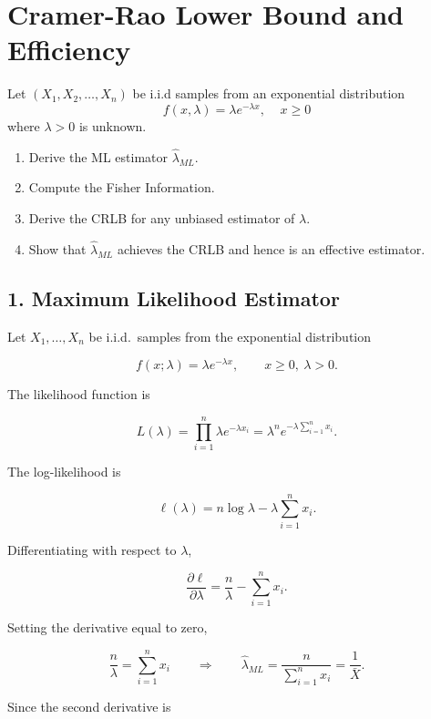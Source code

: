 \clearpage
\section{Cramer-Rao Lower Bound and Efficiency}

\begin{colbox}
	Let $(X_1,X_2,\dots,X_n)$ be i.i.d samples from an exponential distribution
	\begin{equation*}
		f(x,\lambda) = \lambda e^{-\lambda x}, \;\;\;\; x\geq0
	\end{equation*}
	where $\lambda>0$ is unknown.
	\begin{enumerate}
		\item Derive the ML estimator $\hat\lambda_{ML}$.
		\item Compute the Fisher Information.
		\item Derive the CRLB for any unbiased estimator of $\lambda$.
		\item Show that $\hat\lambda_{ML}$ achieves the CRLB and hence is an effective estimator.
	\end{enumerate}
\end{colbox}

\subsection*{1. Maximum Likelihood Estimator}

Let \(X_1,\dots,X_n\) be i.i.d.\ samples from the exponential distribution

\[
f(x;\lambda) = \lambda e^{-\lambda x}, \qquad x \ge 0,\ \lambda > 0.
\]

The likelihood function is

\[
L(\lambda)
= \prod_{i=1}^n \lambda e^{-\lambda x_i}
= \lambda^n e^{-\lambda\sum_{i=1}^n x_i}.
\]

The log-likelihood is

\[
\ell(\lambda)
= n\log \lambda - \lambda \sum_{i=1}^n x_i.
\]

Differentiating with respect to \(\lambda\),

\[
\frac{\partial \ell}{\partial \lambda}
= \frac{n}{\lambda} - \sum_{i=1}^n x_i.
\]

Setting the derivative equal to zero,

\[
\frac{n}{\lambda} = \sum_{i=1}^n x_i
\qquad \Longrightarrow \qquad
\hat{\lambda}_{ML} = \frac{n}{\sum_{i=1}^n x_i}
= \frac{1}{\bar X}.
\]

Since the second derivative is

